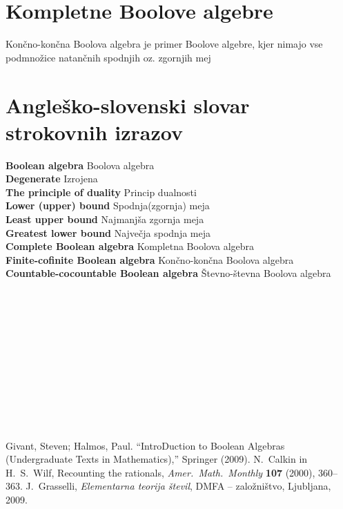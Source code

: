 \documentclass{amsart}
\newcommand{\geslo}[2]{\noindent\textbf{#1} \quad \hangindent=1cm #2\\[-1pc]}
\begin{document}
\section{Kompletne Boolove algebre}

Končno-končna Boolova algebra je primer Boolove algebre, kjer nimajo vse podmnožice
natančnih spodnjih oz. zgornjih mej




\newpage
\section*{Angleško-slovenski slovar strokovnih izrazov}


\geslo{Boolean algebra}{Boolova algebra}

\geslo{Degenerate}{Izrojena}

\geslo{The principle of duality}{Princip dualnosti}

\geslo{Lower (upper) bound}{Spodnja(zgornja) meja}

\geslo{Least upper bound}{Najmanjša zgornja meja}

\geslo{Greatest lower bound}{Največja spodnja meja}

\geslo{Complete Boolean algebra}{Kompletna Boolova algebra}

\geslo{Finite-cofinite Boolean algebra}{Končno-končna Boolova algebra}

\geslo{Countable-cocountable Boolean algebra}{Števno-števna Boolova algebra}

\geslo{}{}

\geslo{}{}

\geslo{}{}

\geslo{}{}

\geslo{}{}

\geslo{}{}

\geslo{}{}

\geslo{}{}

\geslo{}{}

\geslo{}{}


\geslo{}{}






\begin{thebibliography}{1}
Givant, Steven; Halmos, Paul. “IntroDuction to Boolean Algebras (Undergraduate Texts in Mathematics),” Springer (2009).
N.~Calkin in H.~S.~Wilf, Recounting the rationals,
\emph{Amer.~Math.~Monthly}  \textbf{107}  (2000),  360--363.
J.~Grasselli, \emph{Elementarna teorija števil}, DMFA -- založništvo, Ljubljana, 2009.
\end{thebibliography}
\end{document}
